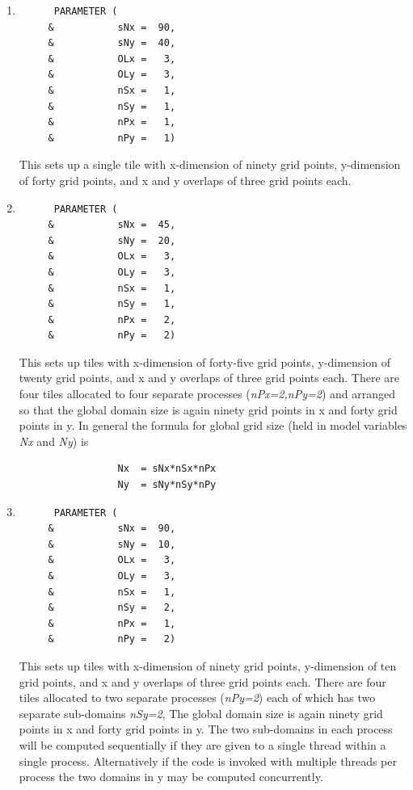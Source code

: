 \begin{enumerate}
\item
\begin{verbatim}
      PARAMETER (
     &           sNx =  90,
     &           sNy =  40,
     &           OLx =   3,
     &           OLy =   3,
     &           nSx =   1,
     &           nSy =   1,
     &           nPx =   1,
     &           nPy =   1)
\end{verbatim}
This sets up a single tile with x-dimension of ninety grid points, y-dimension of
forty grid points, and x and y overlaps of three grid points each.
\item
\begin{verbatim}
      PARAMETER (
     &           sNx =  45,
     &           sNy =  20,
     &           OLx =   3,
     &           OLy =   3,
     &           nSx =   1,
     &           nSy =   1,
     &           nPx =   2,
     &           nPy =   2)
\end{verbatim}
This sets up tiles with x-dimension of forty-five grid points, y-dimension of
twenty grid points, and x and y overlaps of three grid points each. There are
four tiles allocated to four separate processes ({\em nPx=2,nPy=2}) and
arranged so that the global domain size is again ninety grid points in x and
forty grid points in y. In general the formula for global grid size (held in
model variables {\em Nx} and {\em Ny}) is
\begin{verbatim}
                 Nx  = sNx*nSx*nPx
                 Ny  = sNy*nSy*nPy
\end{verbatim}
\item
\begin{verbatim}
      PARAMETER (
     &           sNx =  90,
     &           sNy =  10,
     &           OLx =   3,
     &           OLy =   3,
     &           nSx =   1,
     &           nSy =   2,
     &           nPx =   1,
     &           nPy =   2)
\end{verbatim}
This sets up tiles with x-dimension of ninety grid points, y-dimension of
ten grid points, and x and y overlaps of three grid points each. There are
four tiles allocated to two separate processes ({\em nPy=2}) each of which
has two separate sub-domains {\em nSy=2},
The global domain size is again ninety grid points in x and
forty grid points in y. The two sub-domains in each process will be computed 
sequentially if they are given to a single thread within a single process.
Alternatively if the code is invoked with multiple threads per process
the two domains in y may be computed concurrently.

\end{enumerate}
